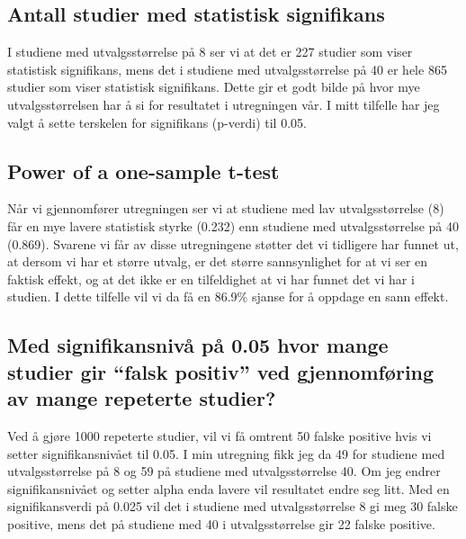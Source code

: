 \documentclass[
  letterpaper,
  DIV=11,
  numbers=noendperiod]{scrreprt}
\begin{document}
\subsection{Antall studier med statistisk
signifikans}\label{antall-studier-med-statistisk-signifikans}

I studiene med utvalgsstørrelse på 8 ser vi at det er 227 studier som
viser statistisk signifikans, mens det i studiene med utvalgsstørrelse
på 40 er hele 865 studier som viser statistisk signifikans. Dette gir et
godt bilde på hvor mye utvalgsstørrelsen har å si for resultatet i
utregningen vår. I mitt tilfelle har jeg valgt å sette terskelen for
signifikans (p-verdi) til 0.05.

\subsection{Power of a one-sample
t-test}\label{power-of-a-one-sample-t-test}

Når vi gjennomfører utregningen ser vi at studiene med lav
utvalgsstørrelse (8) får en mye lavere statistisk styrke (0.232) enn
studiene med utvalgsstørrelse på 40 (0.869). Svarene vi får av disse
utregningene støtter det vi tidligere har funnet ut, at dersom vi har et
større utvalg, er det større sannsynlighet for at vi ser en faktisk
effekt, og at det ikke er en tilfeldighet at vi har funnet det vi har i
studien. I dette tilfelle vil vi da få en 86.9\% sjanse for å oppdage en
sann effekt.

\subsection{Med signifikansnivå på 0.05 hvor mange studier gir ``falsk
positiv'' ved gjennomføring av mange repeterte
studier?}\label{med-signifikansnivuxe5-puxe5-0.05-hvor-mange-studier-gir-falsk-positiv-ved-gjennomfuxf8ring-av-mange-repeterte-studier}

Ved å gjøre 1000 repeterte studier, vil vi få omtrent 50 falske positive
hvis vi setter signifikansnivået til 0.05. I min utregning fikk jeg da
49 for studiene med utvalgsstørrelse på 8 og 59 på studiene med
utvalgsstørrelse 40. Om jeg endrer signifikansnivået og setter alpha
enda lavere vil resultatet endre seg litt. Med en signifikansverdi på
0.025 vil det i studiene med utvalgsstørrelse 8 gi meg 30 falske
positive, mens det på studiene med 40 i utvalgsstørrelse gir 22 falske
positive.

\end{document}

